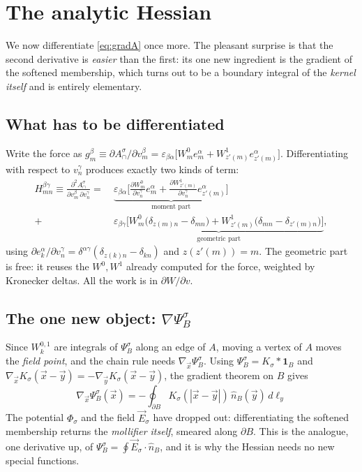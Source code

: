\documentclass[11pt]{article}
\numberwithin{equation}{section}
\newcommand{\vv}[1]{\vec{#1}}
\newcommand{\eps}{\varepsilon}
\begin{document}
\section{The analytic Hessian}\label{sec:hessian}

We now differentiate \eqref{eq:gradA} once more. The pleasant surprise is that the second derivative is
\emph{easier} than the first: its one new ingredient is the gradient of the softened membership, which
turns out to be a boundary integral of the \emph{kernel itself} and is entirely elementary.

\subsection{What has to be differentiated}
Write the force as $g_m^\beta\equiv\partial A_\cap^\sigma/\partial v_m^\beta
=\eps_{\beta\alpha}\big[W_m^{0}e_m^\alpha+W_{z'(m)}^{1}e_{z'(m)}^\alpha\big]$. Differentiating with
respect to $v_n^\gamma$ produces exactly two kinds of term:
\begin{equation}\label{eq:H2kinds}
\begin{aligned}
  H^{\beta\gamma}_{mn}\equiv\frac{\partial^2A_\cap^\sigma}{\partial v_m^\beta\,\partial v_n^\gamma}
  =\ &\underbrace{\eps_{\beta\alpha}\Big[\frac{\partial W_m^{0}}{\partial v_n^\gamma}e_m^\alpha
   +\frac{\partial W_{z'(m)}^{1}}{\partial v_n^\gamma}e_{z'(m)}^\alpha\Big]}_{\text{moment part}}\\
  +\ &\underbrace{\eps_{\beta\gamma}\Big[W_m^{0}\big(\delta_{z(m)n}-\delta_{mn}\big)
   +W_{z'(m)}^{1}\big(\delta_{mn}-\delta_{z'(m)n}\big)\Big]}_{\text{geometric part}} ,
\end{aligned}
\end{equation}
using $\partial e_k^\alpha/\partial v_n^\gamma=\delta^{\alpha\gamma}(\delta_{z(k)n}-\delta_{kn})$ and
$z(z'(m))=m$. The geometric part is free: it reuses the $W^{0},W^{1}$ already computed for the force,
weighted by Kronecker deltas. All the work is in $\partial W/\partial v$.

\subsection{The one new object: \texorpdfstring{$\nabla\Psi_B^\sigma$}{grad Psi\_B}}
Since $W_k^{0,1}$ are integrals of $\Psi_B^\sigma$ along an edge of $A$, moving a vertex of $A$ moves
the \emph{field point}, and the chain rule needs $\nabla_{\!\vv x}\Psi_B^\sigma$. Using
$\Psi_B^\sigma=K_\sigma*\mathbf 1_B$ and $\nabla_{\!\vv x}K_\sigma(\vv x-\vv y)
=-\nabla_{\!\vv y}K_\sigma(\vv x-\vv y)$, the gradient theorem on $B$ gives
\begin{equation}\label{eq:gradPsi}
  \boxed{\;\nabla_{\!\vv x}\Psi_B^\sigma(\vv x)
  =-\oint_{\partial B}K_\sigma(|\vv x-\vv y|)\,\hat n_B(\vv y)\,d\ell_y\;}
\end{equation}
The potential $\Phi_\sigma$ and the field $\vv E_\sigma$ have dropped out: differentiating the softened
membership returns the \emph{mollifier itself}, smeared along $\partial B$. This is the analogue, one
derivative up, of $\Psi_B^\sigma=\oint\vv E_\sigma\!\cdot\!\hat n_B$, and it is why the Hessian needs no
new special functions.
\end{document}
